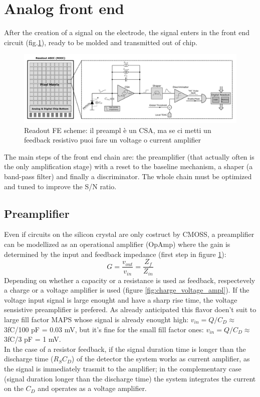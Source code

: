 \section{Analog front end}
After the creation of a signal on the electrode, the signal enters in the front end circuit (fig.\ref{fig:readout_scheme}), ready to be molded and transmitted out of chip.
\begin{figure}
   \centering
   \includegraphics[width=1.\linewidth]{figures/readout_scheme.png}
   \caption{Readout FE scheme: il preampl è un CSA, ma se ci metti un feedback resistivo puoi fare un voltage o current amplifier}
   \label{fig:readout_scheme}
\end{figure}
The main steps of the front end chain are: the preamplifier (that actually often is the only amplification stage) with a reset to the baseline mechanism, a shaper (a band-pass filter) and finally a discriminator. The whole chain must be optimized and tuned to improve the S/N ratio.

\subsection{Preamplifier}
Even if circuits on the silicon crystal are only costruct by CMOSS, a preamplifier can be modellized as an operational amplifier (OpAmp) where the gain is determined by the input and feedback impedance (first step in figure \ref{fig:readout_scheme}):
\begin{equation}
   G = \frac{v_{out}}{v_{in}} = \frac{Z_{f}}{Z_{in}}
\end{equation}
Depending on whether a capacity or a resistance is used as feedback, respectevely a charge or a voltage amplifier is used (figure \ref{fig:charge_voltage_ampl}). If the voltage input signal is large enought and have a sharp rise time, the voltage sensistive preamplifier is prefered. As already anticipated this flavor doen't suit to large fill factor MAPS whose signal is already enought high: $v_{in} = Q/C_{D} \approx$ 3fC/100 pF = 0.03 mV, but it's fine for the small fill factor ones: $v_{in} = Q/C_{D} \approx$ 3fC/3 pF = 1 mV.\\
In the case of a resistor feedback, if the signal duration time is longer than the discharge time  ($R_S C_D$) of the detector the system works as current amplifier, as the signal is immediately trasmit to the amplifier; in the complementary case (signal duration longer than the discharge time) the system integrates the current on the $C_D$ and operates as a voltage amplifier.

